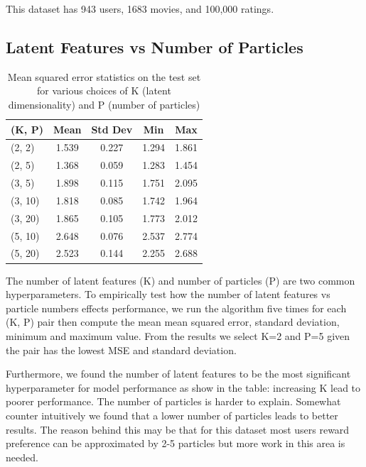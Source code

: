 \documentclass{article}
\begin{document}
This dataset has 943 users, 1683 movies, and 100,000 ratings.
\subsection{Latent Features vs Number of Particles}

\begin{table}[ht]
\caption{Mean squared error statistics on the test set for various choices of K
(latent dimensionality) and P (number of particles)}
\label{sample-table}
\vskip 0.15in
\begin{center}
\begin{small}
\begin{sc}
\begin{tabular}{lcccc}
\toprule
(K, P) & Mean & Std Dev & Min & Max \\
\midrule
(2, 2)  & 1.539 & 0.227 & 1.294 & 1.861 \\
(2, 5)  & 1.368 & 0.059 & 1.283 & 1.454 \\
(3, 5)  & 1.898 & 0.115 & 1.751 & 2.095 \\
(3, 10) & 1.818 & 0.085 & 1.742 & 1.964 \\
(3, 20) & 1.865 & 0.105 & 1.773 & 2.012 \\
(5, 10) & 2.648 & 0.076 & 2.537 & 2.774 \\
(5, 20) & 2.523 & 0.144 & 2.255 & 2.688 \\
\bottomrule
\end{tabular}
\end{sc}
\end{small}
\end{center}
\vskip -0.1in
\end{table}

The number of latent features (K) and number of particles (P) are two common hyperparameters. To empirically test how the number of latent features vs particle numbers effects performance, we run the algorithm five times for each (K, P) pair then compute the mean mean squared error, standard deviation, minimum and maximum value. From the results we select K=2 and P=5 given the pair has the lowest MSE and standard deviation.

Furthermore, we found the number of latent features to be the most significant hyperparameter for model performance as show in the table: increasing K lead to poorer performance. The number of particles is harder to explain. Somewhat counter intuitively we found that a lower number of particles leads to better results. The reason behind this may be that for this dataset most users reward preference can be approximated by 2-5 particles but more work in this area is needed.
\end{document}
